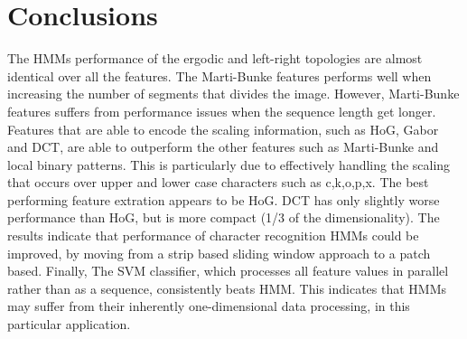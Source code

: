 \documentclass[runningheads]{llncs}
\begin{document}
{\section{Conclusions}
\label{sec:conc}




The HMMs performance of the ergodic and left-right topologies are almost identical over all the features. The Marti-Bunke features performs well when increasing the number of segments that divides the image. However, Marti-Bunke features suffers from performance issues when the sequence length get longer. Features that are able to encode the scaling information, such as HoG, Gabor and DCT, are able to outperform the other features such as Marti-Bunke and local binary patterns. This is particularly due to effectively handling the scaling that occurs over upper and lower case characters such as c,k,o,p,x. The best performing feature extration appears to be HoG. DCT has only slightly worse performance than HoG, but is more compact (1/3 of the dimensionality). The results indicate that performance of character recognition HMMs could be improved, by moving from a strip based sliding window approach to a patch based. Finally, The SVM classifier, which processes all feature values in parallel rather than as a sequence, consistently beats HMM. This indicates that HMMs may suffer from their inherently one-dimensional data processing, in this particular application. 

}
\end{document}
